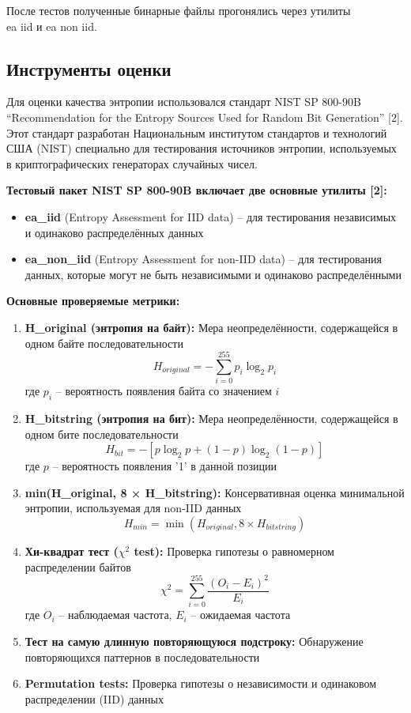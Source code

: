 \documentclass[14pt, a4paper]{extreport}
\begin{document}
После тестов полученные бинарные файлы прогонялись через утилиты \\ ea iid и ea non iid.

\subsection{Инструменты оценки}

Для оценки качества энтропии использовался стандарт NIST SP 800-90B ``Recommendation for the Entropy Sources Used for Random Bit Generation'' [2]. Этот стандарт разработан Национальным институтом стандартов и технологий США (NIST) специально для тестирования источников энтропии, используемых в криптографических генераторах случайных чисел.

\textbf{Тестовый пакет NIST SP 800-90B включает две основные утилиты [2]:}
\begin{itemize}
    \item \textbf{ea\_iid} (Entropy Assessment for IID data) -- для тестирования независимых и одинаково распределённых данных
    \item \textbf{ea\_non\_iid} (Entropy Assessment for non-IID data) -- для тестирования данных, которые могут не быть независимыми и одинаково распределёнными
\end{itemize}

\textbf{Основные проверяемые метрики:}
\begin{enumerate}
    \item \textbf{H\_original (энтропия на байт):} Мера неопределённости, содержащейся в одном байте последовательности
    $$H_{original} = -\sum_{i=0}^{255} p_i \log_2 p_i$$
    где $p_i$ -- вероятность появления байта со значением $i$
    
    \item \textbf{H\_bitstring (энтропия на бит):} Мера неопределённости, содержащейся в одном бите последовательности
    $$H_{bit} = -[p \log_2 p + (1-p) \log_2 (1-p)]$$
    где $p$ -- вероятность появления '1' в данной позиции
    
    \item \textbf{min(H\_original, 8 × H\_bitstring):} Консервативная оценка минимальной энтропии, используемая для non-IID данных
    $$H_{min} = \min(H_{original}, 8 \times H_{bitstring})$$
    
    \item \textbf{Хи-квадрат тест ($\chi^2$ test):} Проверка гипотезы о равномерном распределении байтов
    $$\chi^2 = \sum_{i=0}^{255} \frac{(O_i - E_i)^2}{E_i}$$
    где $O_i$ -- наблюдаемая частота, $E_i$ -- ожидаемая частота
    
    \item \textbf{Тест на самую длинную повторяющуюся подстроку:} Обнаружение повторяющихся паттернов в последовательности
    
    \item \textbf{Permutation tests:} Проверка гипотезы о независимости и одинаковом распределении (IID) данных
\end{enumerate}
\end{document}

